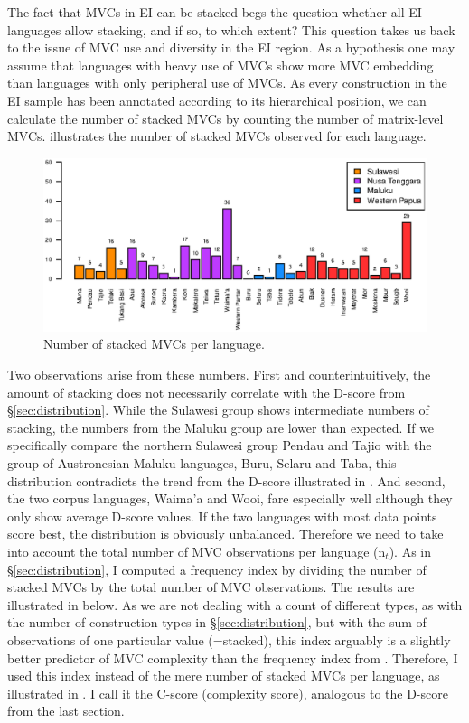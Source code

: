 The fact that MVCs in EI can be stacked begs the question whether all EI languages allow stacking, and if so, to which extent? This question takes us back to the issue of MVC use and diversity in the EI region. As a hypothesis one may assume that languages with heavy use of MVCs show more MVC embedding than languages with only peripheral use of MVCs. As every construction in the EI sample has been annotated according to its hierarchical position, we can calculate the number of stacked MVCs by counting the number of matrix-level MVCs.  illustrates the number of stacked MVCs observed for each language.

\begin{figure}
\includegraphics[width=\textwidth]{figures/number_stackedMVC_clean.eps}
\caption[Number of stacked MVCs per language]{Number of stacked MVCs per language.}\label{fig:stacked}
\end{figure}

Two observations arise from these numbers. First and counterintuitively, the amount of stacking does not necessarily correlate with the D-score from §\ref{sec:distribution}. While the Sulawesi group shows intermediate numbers of stacking, the numbers from the Maluku group are lower than expected. If we specifically compare the northern Sulawesi group Pendau and Tajio with the group of Austronesian Maluku languages, Buru, Selaru and Taba, this distribution contradicts the trend from the D-score illustrated in . And second, the two corpus languages, Waima'a and Wooi, fare especially well although they only show average D-score values. If the two languages with most data points score best, the distribution is obviously unbalanced. Therefore we need to take into account the total number of MVC observations per language (n$_t$). As in §\ref{sec:distribution}, I computed a frequency index by dividing the number of stacked MVCs by the total number of MVC observations. The results are illustrated in  below. As we are not dealing with a count of different types, as with the number of construction types in §\ref{sec:distribution}, but with the sum of observations of one particular value (=stacked), this index arguably is a slightly better predictor of MVC complexity than the frequency index from . Therefore, I used this index instead of the mere number of stacked MVCs per language, as illustrated in . I call it the C-score (complexity score), analogous to the D-score from the last section.

